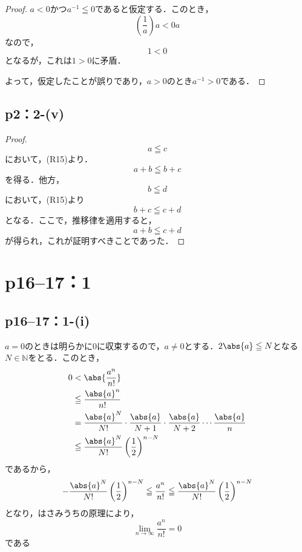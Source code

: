 \documentclass[a4paper,10pt,fleqn]{ltjsarticle}
\begin{document}
\begin{leftbar}
    \begin{proof}
        $a<0$かつ$a^{-1} \leqq 0$であると仮定する．このとき，
        \[
            \left ( \frac{1}{a} \right) a < 0a
        \]
        なので，
        \[
            1<0
        \]
        となるが，これは$1>0$に矛盾．

        よって，仮定したことが誤りであり，$a>0$のとき$a^{-1} >0$である．
    \end{proof}
\end{leftbar}

\subsection*{p2：2-(v)}

\begin{leftbar}
    \begin{proof}
        \[
            a \leqq c
        \]
        において，(R15)より．
        \[
            a+b \leqq b+c
        \]
        を得る．他方，
        \[
            b \leqq d
        \]
        において，(R15)より
        \[
            b + c \leqq c+d
        \]
        となる．ここで，推移律を適用すると，
        \[
            a+b \leqq c+d
        \]
        が得られ，これが証明すべきことであった．
    \end{proof}
\end{leftbar}
%
\section*{p16--17：1}

\subsection*{p16--17：1-(i)}

\begin{tleftbar}
    $a=0$のときは明らかに$0$に収束するので，$a \ne 0$とする．$2\abs{a} \le N$となる$N \in \mathbb{N}$をとる．このとき，
    \begin{align*}
        0 & < \abs{ \frac{a^n}{n!} }                                                                              \\
          & \le \frac{\abs{a}^n}{n!}                                                                              \\
          & = \frac{\abs{a}^{N}}{N!} \cdot \frac{\abs{a}}{N+1} \cdot \frac{\abs{a}}{N+2} \dotsm \frac{\abs{a}}{n} \\
          & \le  \frac{\abs{a}^{N}}{N!} \left(\frac{1}{2} \right)^{n-N}
    \end{align*}
    であるから，
    \[
        - \frac{\abs{a}^{N}}{N!} \left(\frac{1}{2} \right)^{n-N} \le  \frac{a^n}{n!} \le \frac{\abs{a}^{N}}{N!} \left(\frac{1}{2} \right)^{n-N}
    \]
    となり，はさみうちの原理により，
    \[
        \lim_{n \to \infty} \frac{a^n}{n!} =0
    \]
    である
\end{tleftbar}
\end{document}
